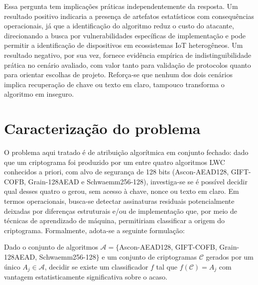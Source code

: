 Essa pergunta tem implicações práticas independentemente da resposta. Um resultado positivo indicaria a presença de artefatos estatísticos com consequências operacionais, já que a identificação do algoritmo reduz o custo do atacante, direcionando a busca por vulnerabilidades específicas de implementação e pode permitir a identificação de dispositivos em ecossistemas IoT heterogêneos. Um resultado negativo, por sua vez, fornece evidência empírica de indistinguibilidade prática no cenário avaliado, com valor tanto para validação de protocolos quanto para orientar escolhas de projeto. Reforça-se que nenhum dos dois cenários implica recuperação de chave ou texto em claro, tampouco transforma o algoritmo em inseguro.


















\section{Caracterização do problema}

O problema aqui tratado é de atribuição algorítmica em conjunto fechado: dado
que um criptograma foi produzido por um entre quatro algoritmos LWC
conhecidos a priori, com alvo de segurança de 128 bits (Ascon-AEAD128,
GIFT-COFB, Grain-128AEAD e Schwaemm256-128), investiga-se se é possível
decidir qual desses quatro o gerou,
sem acesso à chave, nonce ou texto em claro. Em termos operacionais, busca-se
detectar assinaturas residuais potencialmente deixadas por diferenças
estruturais e/ou de implementação que, por meio de técnicas de aprendizado de
máquina, permitiriam classificar a origem do criptograma. Formalmente, adota-se
a seguinte formulação:

Dado o conjunto de algoritmos $\mathcal{A} = \{$Ascon-AEAD128, GIFT-COFB,
Grain-128AEAD, Schwaemm256-128$\}$ e um conjunto
de criptogramas $\mathcal{C}$ gerados por um único
$A_j \in \mathcal{A}$,
decidir se existe um classificador $f$ tal que $f(\mathcal{C}) = A_j$ com
vantagem estatisticamente significativa sobre o acaso.

